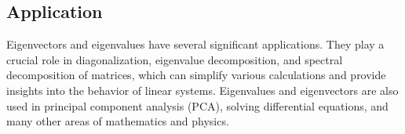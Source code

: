 \documentclass{report}
\begin{document}
\subsection{Application}
Eigenvectors and eigenvalues have several significant applications. They play a crucial role in diagonalization, eigenvalue decomposition, and spectral decomposition of matrices, which can simplify various calculations and provide insights into the behavior of linear systems. Eigenvalues and eigenvectors are also used in principal component analysis (PCA), solving differential equations, and many other areas of mathematics and physics.
\end{document}
